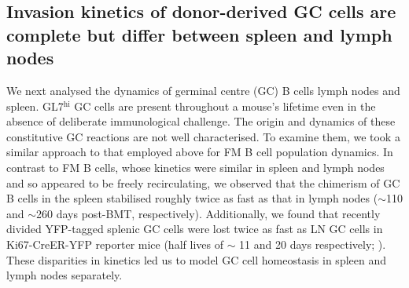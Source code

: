 \documentclass[12pt]{article}
\newcommand{\superscript}[1]{\ensuremath{^{\textrm{#1}}}} %
\newcommand{\red}[1]{{\color{red}{#1}}}
\newcommand{\khi}{Ki67$^\text{hi}$}
\begin{document}
\subsection*{Invasion kinetics of donor-derived GC cells are complete but differ between spleen and lymph nodes}
We next analysed the dynamics of  germinal centre (GC) B cells lymph nodes and spleen. GL7\superscript{hi} GC cells are present throughout a mouse's lifetime even in the absence of deliberate immunological challenge. The origin and dynamics of these constitutive GC reactions are not well characterised. To examine them, we took a similar approach to that employed above for FM B cell population dynamics.  In contrast to FM B cells, whose kinetics were similar in spleen and lymph nodes and so appeared to be freely recirculating, we observed that the chimerism of GC B cells in the spleen stabilised roughly twice as fast as that in lymph nodes ($\sim$110 and $\sim$260 days post-BMT, respectively). Additionally, we found that recently divided YFP-tagged splenic GC cells were lost twice as fast as LN GC cells in Ki67-CreER-YFP reporter mice (half lives of $\sim$ 11 and 20 days respectively; \red{see Methods for details}).  These disparities in kinetics led us to model  GC cell homeostasis in spleen and lymph nodes separately. 




%	
%	
%	
	
\end{document}
